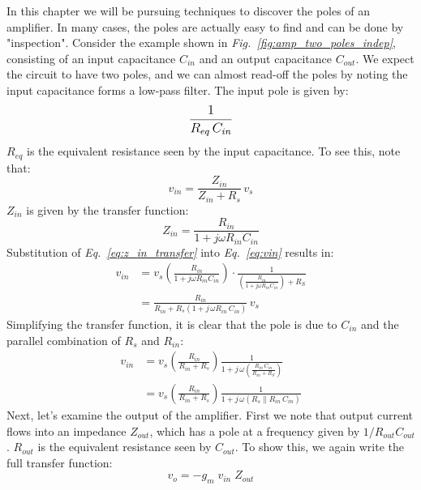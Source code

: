 In this chapter we will be pursuing techniques to discover the poles of an amplifier.  In many cases, the poles are actually easy to find and can be done by "inspection".  Consider the example shown in \emph{Fig.~\ref{fig:amp_two_poles_indep}}, consisting of an input capacitance $C_{in}$ and an output capacitance $C_{out}$.  We expect the circuit to have two poles, and we can almost read-off the poles by noting the input capacitance forms a low-pass filter.  The input pole is given by:
    \[
        \mathlarger{\frac{1}{R_{eq}\,C_{in}}}
    \]
$R_{eq}$ is the equivalent resistance seen by the input capacitance.  To see this, note that:
    \begin{equation}
        v_{in} = \frac{Z_{in}}{Z_{in} + R_s}\,v_s
        \label{eq:vin}
    \end{equation} 
$Z_{in}$ is given by the transfer function:
    \begin{equation}
        Z_{in} = \frac{R_{in}}{1 + j\omega R_{in} C_{in}}
        \label {eq:z_in_transfer}
    \end{equation}
Substitution of \emph{Eq.~\ref{eq:z_in_transfer}} into \emph{Eq.~\ref{eq:vin}} results in:
    \begin{align}
        v_{in} &= v_s\left(\frac{R_{in}}{1 + j\omega R_{in} C_{in}}\right)
                    \cdot \frac{1}{\left(\frac{R_{in}}{1 + j\omega R_{in} C_{in}}\right) + R_S}\\[0.25cm]
        &= \frac{R_{in}}{R_{in} + R_s(1 + j\,\omega R_{in}\,C_{in})}\,v_s
    \end{align}
Simplifying the transfer function, it is clear that the pole is due to $C_{in}$ and the parallel combination of $R_s $ and $R_{in}$:
    \begin{align}
        v_{in} &= v_s \left(\frac{R_{in}}{R_{in} + R_s}\right) \frac{1}{1 + j\,\omega\left(\frac{R_{in}\,C_{in}}{R_{in} + R_S}\right)}\\[0.25cm]
        &= v_s \left(\frac{R_{in}}{R_{in} + R_s}\right) \frac{1}{1 + j\,\omega(R_s \parallel R_{in}\,C_{in})}
    \end{align}
\newpage
\noindent
Next, let's examine the output of the amplifier.  First we note that output current flows into an impedance $Z_{out}$, which has a pole at a frequency given by $1/R_{out}C_{out}$. $R_{out}$ is the equivalent resistance seen by $C_{out}$.  To show this, we again write the full transfer function:
    \begin{equation}
        v_o = -g_m\;v_{in}\;Z_{out} 
    \end{equation}
